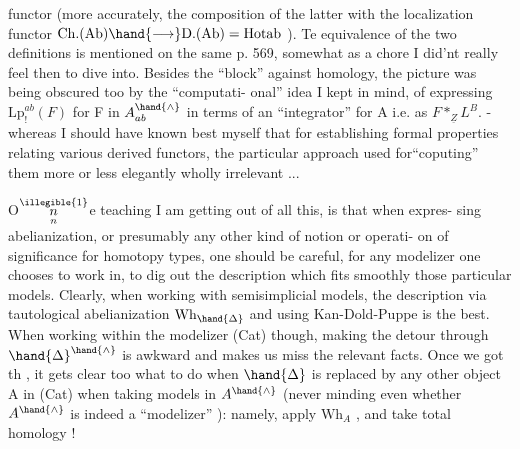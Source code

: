 functor (more accurately, the composition of the latter with the
localization functor $\mathrm{Ch}.(\mathrm{Ab})\hand{\longrightarrow} \mathrm{D}.(\mathrm{Ab}) = \mathrm{Hotab}$ ). Te equivalence of
the two definitions  is mentioned on the same p. 569, somewhat as a
chore I did'nt really feel then to dive into.  Besides the ``block''
against homology, the picture was being obscured too by the ``computati-%
onal'' idea I kept in mind, of expressing $\mathrm{Lp}_{!}^{ab}(F)$ for F in $A^{\hand{\wedge}}_{ab}$ in
terms of an ``integrator'' for A i.e. as $F *_{\underline{Z}} L^{B}.$ - whereas I should
have known best myself that for establishing formal properties relating
various derived functors, the particular  approach used
for``coputing'' them more or less elegantly  wholly irrelevant ...

O$\overset{\illegible{1}}{\underset{n}{n}}$e teaching I am getting out of all this, is that when expres-%
sing abelianization, or presumably any other kind of notion or operati-%
on of significance for homotopy types, one should be careful, for
any modelizer one chooses to work in, to dig out the description which
fits smoothly those particular models. Clearly, when working with
semisimplicial models, the description via tautological abelianization
$\mathrm{Wh}_{\hand{\Delta}}$ and using Kan-Dold-Puppe is the best. When working within the
modelizer (Cat) though, making the detour through $\hand{\Delta}^{\hand{\wedge}}$ is awkward and
makes us  miss  the relevant facts. Once we got th
, it gets clear too what to do when $\hand{\Delta}$ is replaced by any
other object A in (Cat) 
when taking models in $A^{\hand{\wedge}}$ (never minding even whether $A^{\hand{\wedge}}$ is indeed a
``modelizer'' ): namely, apply $\mathrm{Wh}_{A}$ , and take total homology !


